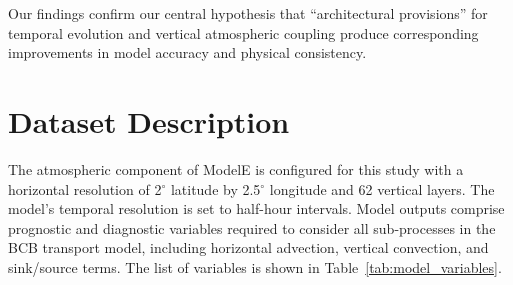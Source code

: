 \documentclass{article}
\begin{document}
    Our findings confirm our central hypothesis that ``architectural provisions'' for temporal evolution and vertical atmospheric coupling produce corresponding improvements in model accuracy and physical consistency.




\newpage \appendix
\section{Dataset Description} \label{sec:appendix-1}
    The atmospheric component of ModelE is configured for this study with a horizontal resolution of 2$^\circ$ latitude by 2.5$^\circ$ longitude and 62 vertical layers. The model's temporal resolution is set to half-hour intervals. Model outputs comprise prognostic and diagnostic variables required to consider all sub-processes in the BCB transport model, including horizontal advection, vertical convection, and sink/source terms. The list of variables is shown in Table~\ref{tab:model_variables}.
\end{document}
